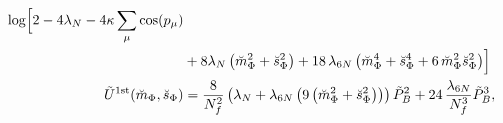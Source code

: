 \begin{align}
                            \log\Bigl[ 2 - 4 \lambda_N - 4 \kappa \sum_{\mu} \cos(p_{\mu})
               \nonumber \\
                        & + 8 \lambda_N \left( \breve m_{\Phi}^2 + \breve s_{\Phi}^2  \right) 
                          + 18\, \lambda_{6N}\left( \breve m_{\Phi}^4 + \breve s_{\Phi}^4 + 6\,  \breve m_{\Phi}^2 \breve s_{\Phi}^2 \right)\Bigr]
%                           
               \\ \label{eq:CEP_bosonicFirstOrderContribution_rescaled}
 \tilde U^{\text{1st}}(\breve m_{\Phi}, \breve s_{\Phi}) & = 
                            \frac{8}{N_f^2} \left( \lambda_N + \lambda_{6N} \left( 
                            9 \left( \breve m_{\Phi}^2 + \breve s_{\Phi}^2 \right) \right) \right) \tilde P_B^2 + 24\,\frac{\lambda_{6N}}{N_f^3} \tilde P_B^3,
\end{align}


